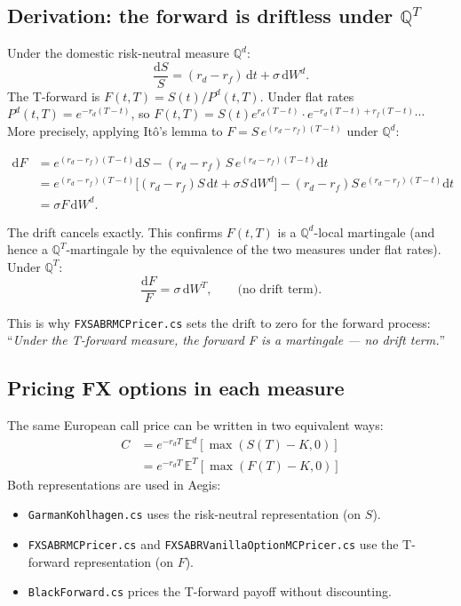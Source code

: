 \documentclass[11pt,a4paper]{article}
\newcommand{\dd}{\mathrm{d}}
\newcommand{\E}{\mathbb{E}}
\newcommand{\QT}{\mathbb{Q}^T}
\newcommand{\Qd}{\mathbb{Q}^d}
\newcommand{\coderef}[1]{\texttt{\color{blue!60!black}#1}}
\theoremstyle{definition}
\begin{document}
\subsection{Derivation: the forward is driftless under $\QT$}

Under the domestic risk-neutral measure $\Qd$:
\[
  \frac{\dd S}{S} = (r_d - r_f)\,\dd t + \sigma\,\dd W^d.
\]
The T-forward is $F(t,T)=S(t)/P^d(t,T)$.  Under flat rates
$P^d(t,T)=e^{-r_d(T-t)}$, so $F(t,T)=S(t)e^{r_d(T-t)}\cdot e^{-r_d(T-t)+r_f(T-t)}\cdots$
More precisely, applying It\^{o}'s lemma to $F=S\,e^{(r_d-r_f)(T-t)}$ under
$\Qd$:

\begin{align*}
  \dd F &= e^{(r_d-r_f)(T-t)}\dd S - (r_d-r_f)\,S\,e^{(r_d-r_f)(T-t)}\dd t \\
        &= e^{(r_d-r_f)(T-t)}\bigl[(r_d-r_f)S\,\dd t + \sigma S\,\dd W^d\bigr]
           -(r_d-r_f)S\,e^{(r_d-r_f)(T-t)}\dd t \\
        &= \sigma F\,\dd W^d.
\end{align*}

The drift cancels exactly.  This confirms $F(t,T)$ is a $\Qd$-local
martingale (and hence a $\QT$-martingale by the equivalence of the two
measures under flat rates).  Under $\QT$:
\[
  \boxed{\frac{\dd F}{F} = \sigma\,\dd W^T,\qquad \text{(no drift term).}}
\]

This is why \coderef{FXSABRMCPricer.cs} sets the drift to zero for the
forward process: ``\emph{Under the T-forward measure, the forward F is a
martingale --- no drift term.}''

\subsection{Pricing FX options in each measure}

The same European call price can be written in two equivalent ways:
\begin{align*}
  C &= e^{-r_d T}\,\E^d[\max(S(T)-K,0)] \tag{risk-neutral on $S$}\\
    &= e^{-r_d T}\,\E^T[\max(F(T)-K,0)] \tag{T-forward on $F$, same terminal value}
\end{align*}
Both representations are used in Aegis:
\begin{itemize}[nosep]
  \item \coderef{GarmanKohlhagen.cs} uses the risk-neutral representation (on $S$).
  \item \coderef{FXSABRMCPricer.cs} and \coderef{FXSABRVanillaOptionMCPricer.cs} use the T-forward representation (on $F$).
  \item \coderef{BlackForward.cs} prices the T-forward payoff without discounting.
\end{itemize}
\end{document}
